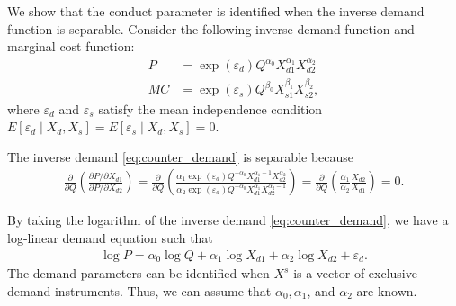 \documentclass[11pt, a4paper]{article}
\theoremstyle{remark}
\begin{document}
We show that the conduct parameter is identified when the inverse demand function is separable. 
Consider the following inverse demand function and marginal cost function:
\begin{align}
    P & = \exp(\varepsilon_{d}) Q^{\alpha_0} X_{d1}^{\alpha_1}X_{d2}^{\alpha_2}\label{eq:counter_demand}\\
    MC & = \exp(\varepsilon_{s})Q^{\beta_0} X_{s1}^{\beta_1} X_{s2}^{\beta_2},\label{eq:counter_mc}
\end{align}
where $\varepsilon_{d}$ and $\varepsilon_{s}$ satisfy the mean independence condition $E[\varepsilon_{d}\mid X_{d}, X_{s}] = E[\varepsilon_{s} \mid X_{d}, X_{s}] =0$. 

The inverse demand \eqref{eq:counter_demand} is separable because
\begin{align}
    \frac{\partial }{\partial Q} \left(\frac{\partial P/\partial X_{d1}}{\partial P/\partial X_{d2}} \right) = \frac{\partial }{\partial Q} \left(\frac{\alpha_{1}\exp(\varepsilon_{d}) Q^{-\alpha_0} X_{d1}^{\alpha_1-1}X_{d2}^{\alpha_2}}{\alpha_2\exp(\varepsilon_{d}) Q^{-\alpha_0} X_{d1}^{\alpha_1}X_{d2}^{\alpha_2-1}} \right) =  \frac{\partial }{\partial Q}\left(\frac{\alpha_1}{\alpha_2} \frac{X_{d2}}{X_{d1}} \right)=0.
\end{align}

By taking the logarithm of the inverse demand \eqref{eq:counter_demand}, we have a log-linear demand equation such that 
\begin{align}
    \log P = \alpha_0 \log Q + \alpha_1 \log X_{d1}  + \alpha_2 \log X_{d2} + \varepsilon_{d}.\label{eq:counter_demand_equation}
\end{align}
The demand parameters can be identified when $X^s$ is a vector of exclusive demand instruments.
Thus, we can assume that $\alpha_0, \alpha_1$, and $\alpha_2$ are known.  
\end{document}

